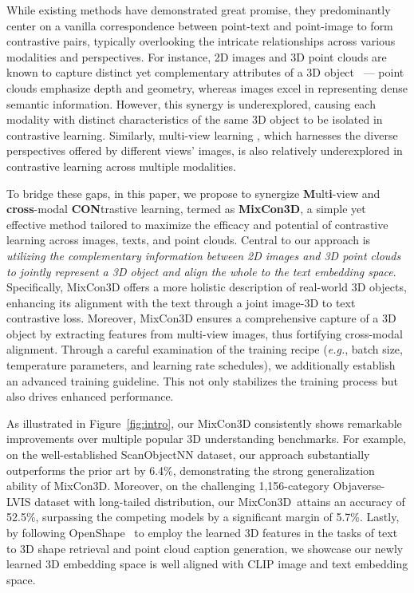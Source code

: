 \documentclass{article} \usepackage{iclr2024_conference,times}
\def\eg{\textit{e.g.}}
\newcommand{\ourmethod}{MixCon3D}
\begin{document}
While existing methods have demonstrated great promise, they predominantly center on a vanilla correspondence between point-text and point-image to form contrastive pairs, typically overlooking the intricate relationships across various modalities and perspectives. 
For instance, 2D images and 3D point clouds are known to capture distinct yet complementary attributes of a 3D object~\citep{bai2022transfusion,liu2023bevfusion,chen2023bevdistill,Wang2023distillbev} --- point clouds emphasize depth and geometry, whereas images excel in representing dense semantic information. 
However, this synergy is underexplored, causing each modality with distinct characteristics of the same 3D object to be isolated in contrastive learning. Similarly, multi-view learning \citep{MVConv,jaritz2019multi,hamdi2021mvtn}, which harnesses the diverse perspectives offered by different views' images, is also relatively underexplored in contrastive learning across multiple modalities.

To bridge these gaps, in this paper, we propose to synergize \textbf{M}ult\textbf{i}-view and \textbf{cross}-modal \textbf{CON}trastive learning, termed as \textbf{MixCon3D}, a simple yet effective method tailored to maximize the efficacy and potential of contrastive learning across images, texts, and point clouds. 
Central to our approach is \emph{utilizing the complementary information between 2D images and 3D point clouds to jointly represent a 3D object and align the whole to the text embedding space}.
Specifically, MixCon3D offers a more holistic description of real-world 3D objects, enhancing its alignment with the text through a joint image-3D to text contrastive loss. 
Moreover, MixCon3D ensures a comprehensive capture of a 3D object by extracting features from multi-view images, thus fortifying cross-modal alignment. 
Through a careful examination of the training recipe (\eg, batch size, temperature parameters, and learning rate schedules), we additionally establish an advanced training guideline.
This not only stabilizes the training process but also drives enhanced performance. 

As illustrated in Figure~\ref{fig:intro}, our MixCon3D consistently shows remarkable improvements over multiple popular 3D understanding benchmarks. 
For example, on the well-established ScanObjectNN dataset, our approach substantially outperforms the prior art by 6.4\%, demonstrating the strong generalization ability of \ourmethod. 
Moreover, on the challenging 1,156-category Objaverse-LVIS dataset with long-tailed distribution, our \ourmethod~attains an accuracy of 52.5\%, surpassing the competing models by a significant margin of 5.7\%. 
Lastly, by following OpenShape~\citep{openshape} to employ the learned 3D features in the tasks of text to 3D shape retrieval and point cloud caption generation, we showcase our newly learned 3D embedding space is well aligned with CLIP image and text embedding space. 
\end{document}
